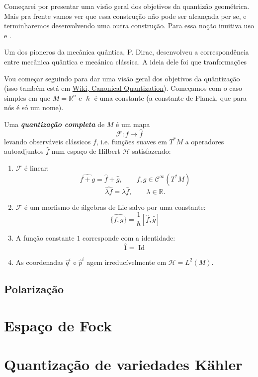 Começarei por presentar uma visão geral dos objetivos da quantizão geométrica. Mais pra frente vamos ver que essa construção não pode ser alcançada per se, e terminharemos desenvolvendo uma outra construção. Para essa noção inuitiva uso \cite{gq} e \cite{k3quant}.

Um dos pioneros da mecânica quântica, P. Dirac, desenvolveu a correspondência entre mecânica quântica e mecánica clássica. A ideia dele foi que tranformações 

Vou começar seguindo \cite{k3quant} para dar uma visão geral dos objetivos da quântização (isso também está em \href{https://en.wikipedia.org/wiki/Canonical_quantization#Classical_and_quantum_brackets}{Wiki, Canonical Quantization}). Começamos com o caso simples em que $M=\mathbb{R}^{n}$ e $\hslash$ é uma constante (a constante de Planck, que para nós é só um nome).

\begin{defn}\leavevmode
	Uma \textit{\textbf{quantização completa}} de $M$ é um mapa
	\[\mathcal{F}:f\longmapsto \hat{f}\]
	levando observáveis clássicos $f $, i.e. funções suaves em $T^*M$ a operadores autoadjuntos $\hat{f}$ num espaço de Hilbert $\mathcal{H}$ satisfazendo:
	\begin{enumerate}
		\item $\mathcal{F}$ é linear:
			\[\widehat{f+g}=\hat{f}+\hat{g},\qquad f,g\in\mathcal{C}^\infty(T^*M)\]
			\[\widehat{\lambda f}=\lambda\hat{f},\qquad \lambda\in\mathbb{R}.\]
	
		\item $ \mathcal{F}$ é um morfismo de álgebras de Lie salvo por uma constante:
			\[\widehat{\{f,g\}}=\frac{1}{\hslash}\left[\hat{f},\hat{g}\right]\]
\item A função constante $1$ corresponde com a identidade:
	\[\hat{1}=\operatorname{Id}\]

	\item As coordenadas $\hat{q}^i$ e $\hat{p}^i$ agem irreducívelmente em $\mathcal{H}=L^2(M)$.
	\end{enumerate}
\end{defn}

\subsection{Polarização}

\section{Espaço de Fock}

\section{Quantização de variedades Kähler}

\fi

\printbibliography


